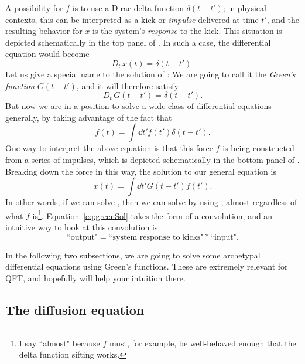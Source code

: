 A possibility for $f$ is to use a Dirac delta function
$\delta(t-t')$; in physical contexts, this can be interpreted as a 
kick or {\it impulse} delivered at time $t'$, and 
the resulting behavior for $x$ is the system's {\it response} 
to the kick. This situation is depicted schematically in the top panel of
. In such a case, the differential equation
 would become
\begin{equation}\label{eq:greenDelta}
  D_t\,x(t)=\delta(t-t').
\end{equation}
Let us give a special name to the solution of : We
are going to call it the {\it Green's function} $G(t-t')$, and it will
therefore satisfy
\begin{equation}\label{eq:greenDeltaSol}
  D_t\,G(t-t')=\delta(t-t').
\end{equation}
But now we are in a position to solve a wide class of differential equations
generally, by taking advantage of the fact that
\begin{equation}\label{eq:deltaSift}
  f(t)=\int\dd{t'}f(t')\delta(t-t').
\end{equation}
One way to interpret the above equation is that this force $f$ is being
constructed from a series of impulses, which is depicted schematically
in the bottom panel of . Breaking down the force
in this way, the solution to our general equation  is
\begin{equation}\label{eq:greenSol}
  x(t)=\int\dd{t'}G(t-t')f(t').
\end{equation}
In other words, if we can solve , then we can
solve  by using , almost
regardless of what $f$ is\footnote{I say ``almost" because $f$ must, for
example, be well-behaved enough that the delta function sifting works.}.
Equation~\eqref{eq:greenSol} takes the form of a convolution, and an
intuitive way to look at this convolution is
\begin{equation}
  \text{``output"} = \text{``system response to kicks"} * \text{``input"}.
\end{equation}

In the following two subsections, we are going to solve some
archetypal differential equations using Green's functions. These are
extremely relevant for QFT, and hopefully will help your intuition there.

\subsection{The diffusion equation}


